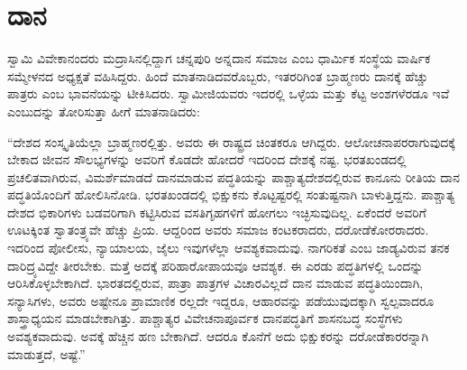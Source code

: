 
\chapter{ದಾನ}

ಸ್ವಾಮಿ ವಿವೇಕಾನಂದರು ಮದ್ರಾಸಿನಲ್ಲಿದ್ದಾಗ ಚನ್ನಪುರಿ ಅನ್ನದಾನ ಸಮಾಜ ಎಂಬ ಧಾರ್ಮಿಕ ಸಂಸ್ಥೆಯ ವಾರ್ಷಿಕ ಸಮ್ಮೇಳನದ ಅಧ್ಯಕ್ಷತೆ ವಹಿಸಿದ್ದರು. ಹಿಂದೆ ಮಾತನಾಡಿದವರೊಬ್ಬರು, ಇತರರಿಗಿಂತ ಬ್ರಾಹ್ಮಣರು ದಾನಕ್ಕೆ ಹೆಚ್ಚು ಪಾತ್ರರು ಎಂಬ ಭಾವನೆಯನ್ನು ಟೀಕಿಸಿದರು. ಸ್ವಾಮೀಜಿಯವರು ಇದರಲ್ಲಿ ಒಳ್ಳೆಯ ಮತ್ತು ಕೆಟ್ಟ ಅಂಶಗಳೆರಡೂ ಇವೆ ಎಂಬುದನ್ನು ತೋರಿಸುತ್ತಾ ಹೀಗೆ ಮಾತನಾಡಿದರು:

“ದೇಶದ ಸಂಸ್ಕೃತಿಯೆಲ್ಲಾ ಬ್ರಾಹ್ಮಣರಲ್ಲಿತ್ತು. ಅವರು ಈ ರಾಷ್ಟ್ರದ ಚಿಂತಕರೂ ಆಗಿದ್ದರು. ಆಲೋಚನಾಪರರಾಗುವುದಕ್ಕೆ ಬೇಕಾದ ಜೀವನ ಸೌಲಭ್ಯಗಳನ್ನು ಅವರಿಗೆ ಕೊಡದೇ ಹೋದರೆ ಇದರಿಂದ ದೇಶಕ್ಕೆ ನಷ್ಟ. ಭರತಖಂಡದಲ್ಲಿ ಪ್ರಚಲಿತವಾಗಿರುವ, ವಿಮರ್ಶೆಮಾಡದೆ ದಾನಮಾಡುವ ಪದ್ಧತಿಯನ್ನು ಪಾಶ್ಚಾತ್ಯದೇಶದಲ್ಲಿರುವ ಕಾನೂನು ರೀತಿಯ ದಾನ ಪದ್ಧತಿಯೊಂದಿಗೆ ಹೋಲಿಸಿನೋಡಿ. ಭರತಖಂಡದಲ್ಲಿ ಭಿಕ್ಷುಕನು ಕೊಟ್ಟಷ್ಟರಲ್ಲಿ ಸಂತುಷ್ಟನಾಗಿ ಬಾಳುತ್ತಿದ್ದನು. ಪಾಶ್ಚಾತ್ಯ ದೇಶದ ಭಿಕಾರಿಗಳು ಬಡವರಿಗಾಗಿ ಕಟ್ಟಿಸಿರುವ ವಸತಿಗೃಹಗಳಿಗೆ ಹೋಗಲು ಇಚ್ಛಿಸುವುದಿಲ್ಲ. ಏಕೆಂದರೆ ಅವರಿಗೆ ಊಟಕ್ಕಿಂತ ಸ್ವಾತಂತ್ರ್ಯವೇ ಹೆಚ್ಚು ಪ್ರಿಯ. ಆದ್ದರಿಂದ ಅವರು ಸಮಾಜ ಕಂಟಕರಾದರು, ದರೋಡೆಕೋರರಾದರು. ಇದರಿಂದ ಪೋಲೀಸು, ನ್ಯಾಯಾಲಯ, ಜೈಲು ಇವುಗಳೆಲ್ಲಾ ಆವಶ್ಯಕವಾದುವು. ನಾಗರಿಕತೆ ಎಂಬ ಜಾಡ್ಯವಿರುವ ತನಕ ದಾರಿದ್ರ್ಯವಿದ್ದೇ ತೀರಬೇಕು. ಮತ್ತೆ ಅದಕ್ಕೆ ಪರಿಹಾರೋಪಾಯವೂ ಆವಶ್ಯಕ. ಈ ಎರಡು ಪದ್ಧತಿಗಳಲ್ಲಿ ಒಂದನ್ನು ಆರಿಸಿಕೊಳ್ಳಬೇಕಾಗಿದೆ. ಭಾರತದಲ್ಲಿರುವ, ಪಾತ್ರಾ ಪಾತ್ರಗಳ ವಿಚಾರವಿಲ್ಲದೆ ದಾನ ಮಾಡುವ ಪದ್ಧತಿಯಿಂದಾಗಿ, ಸನ್ಯಾಸಿಗಳು, ಅವರು ಅಷ್ಟೇನೂ ಪ್ರಾಮಾಣಿಕ ರಲ್ಲದೇ ಇದ್ದರೂ, ಆಹಾರವನ್ನು ಪಡೆಯುವುದಕ್ಕಾಗಿ ಸ್ವಲ್ಪವಾದರೂ ಶಾಸ್ತ್ರಾಧ್ಯಯನ ಮಾಡಬೇಕಾಗಿತ್ತು. ಪಾಶ್ಚಾತ್ಯರ ವಿವೇಚನಾಪೂರ್ವಕ ದಾನಪದ್ಧತಿಗೆ ಶಾಸನಬದ್ಧ ಸಂಸ್ಧೆಗಳು ಅವಶ್ಯಕವಾದುವು. ಅವಕ್ಕೆ ಹೆಚ್ಚಿನ ಹಣ ಬೇಕಾಗಿದೆ. ಆದರೂ ಕೊನೆಗೆ ಅದು ಭಿಕ್ಷುಕರನ್ನು ದರೋಡೆಕಾರರನ್ನಾಗಿ ಮಾಡುತ್ತದೆ, ಅಷ್ಟೆ.”


